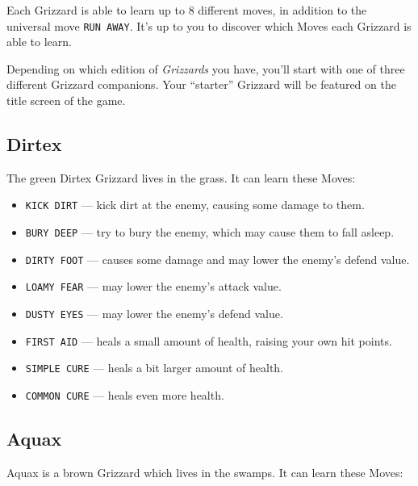 \documentclass[10pt,twocolumn,openany,article]{memoir}
\begin{document}
\begin{description}
\fi

Each Grizzard is able  to learn up to 8 different  moves, in addition to
the universal move  \texttt{RUN AWAY}. It's up to you  to discover which
Moves each  Grizzard is  able to  learn.

\ifdefined\DEMO\else

Depending on which edition of  \textit{Grizzards} you have, you'll start
with  one  of  three  different Grizzard  companions.  Your  ``starter''
Grizzard will be featured on the title screen of the game.

\subsection{Dirtex}

The green Dirtex Grizzard lives in the grass. It can learn these Moves:

\begin{itemize}
\item \texttt{KICK DIRT} --- kick dirt at the enemy, causing some damage
  to them.
\item \texttt{BURY DEEP} --- try to bury the enemy, which may cause them
  to fall asleep.
\item  \texttt{DIRTY FOOT}  --- causes  some  damage and  may lower  the
  enemy's defend value.
\item \texttt{LOAMY FEAR} --- may lower the enemy's attack value.
\item \texttt{DUSTY EYES} --- may lower the enemy's defend value.
\item \texttt{FIRST  AID} ---  heals a small  amount of  health, raising
  your own hit points.
\item \texttt{SIMPLE CURE} --- heals a bit larger amount of health.
\item \texttt{COMMON CURE} --- heals even more health.
\end{itemize}

\fi

\subsection{Aquax}

Aquax is a brown Grizzard which lives  in the swamps. It can learn these
Moves:


\end{description}
\end{document}
